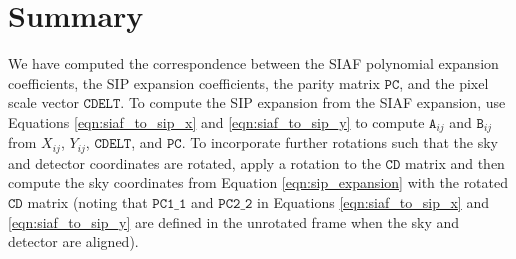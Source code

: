 \documentclass[10pt]{article}
\newcommand{\sipA}[2]{\ensuremath{\mathtt{A}_{#1 #2}}}
\newcommand{\sipB}[2]{\ensuremath{\mathtt{B}_{#1 #2}}}
\begin{document}
\section{Summary}

We have computed the correspondence between the SIAF polynomial
expansion coefficients, the SIP expansion coefficients, the
parity matrix $\mathtt{PC}$, and the pixel scale vector
$\mathtt{CDELT}$. To compute the SIP expansion from the SIAF
expansion, use Equations \ref{eqn:siaf_to_sip_x} and \ref{eqn:siaf_to_sip_y}
to compute $\sipA{i}{j}$ and $\sipB{i}{j}$ from $X_{ij}$, $Y_{ij}$,
$\mathtt{CDELT}$, and $\mathtt{PC}$. To incorporate further rotations
such that the sky and detector coordinates are rotated, apply a rotation
to the $\mathtt{CD}$ matrix and then compute the sky coordinates from
Equation \ref{eqn:sip_expansion} with the rotated $\mathtt{CD}$ matrix
(noting that $\mathtt{PC1\_1}$ and $\mathtt{PC2\_2}$ in Equations
\ref{eqn:siaf_to_sip_x}
 and \ref{eqn:siaf_to_sip_y} are defined in the unrotated frame when the
 sky and detector are aligned).
\end{document}
